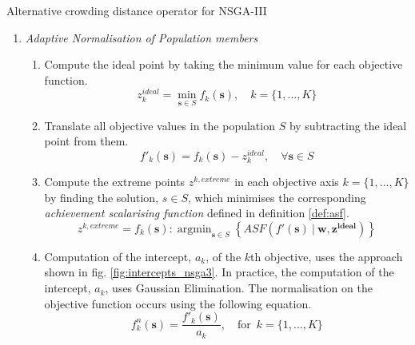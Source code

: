 \documentclass[mscthesis, 11pt]{usiinfthesis}
\DeclareMathOperator*{\argmin}{argmin}
\theoremstyle{newdefinition}
\begin{document}
\begin{algorithm}[ht]
    \small
    \caption{Alternative crowding distance operator for NSGA-III}\label{proc:crowding_nsga3}
    \begin{enumerate}
        \item \emph{Adaptive Normalisation of Population members}\\
        \begin{enumerate}
            \item Compute the ideal point by taking the minimum value for each objective function.
            \begin{equation}
                z_{k}^{ideal} = \min_{\mathbf{s} \in S} f_k (\mathbf{s}), \quad k = \{1,...,K\}
            \end{equation}
            \item Translate all objective values in the population $S$ by subtracting the ideal point from them.
            \begin{equation}
                f'_{k} (\mathbf{s}) = f_{k} (\mathbf{s}) - z_{k}^{ideal}, \quad \forall \mathbf{s} \in S 
            \end{equation}
            \item Compute the extreme points $z^{k,extreme}$ in each objective axis $k = \{1,...,K\}$ by finding the solution, $s \in S$, which minimises the corresponding \emph{achievement scalarising function} defined in definition \ref{def:asf}.
            \begin{equation}
                z^{k, extreme} = f_k(\mathbf{s}): \argmin_{\mathbf{s} \in S} \left\{ASF(f'(\mathbf{s}) \: | \: \mathbf{w, z^{ideal}})\right\}
            \end{equation}
            \item Computation of the intercept, $a_k$, of the $k$th objective, uses the approach shown in fig. \ref{fig:intercepts_nsga3}. In practice, the computation of the intercept, $a_k$, uses Gaussian Elimination. The normalisation on the objective function occurs using the following equation.
            \begin{equation}
                f^{n}_{k} (\mathbf{s}) = \frac{f'_k (\mathbf{s})}{a_k}, \quad \text{for} \enspace k = \{1, ..., K\}

\end{equation}
\end{enumerate}
\end{enumerate}
\end{algorithm}
\end{document}
